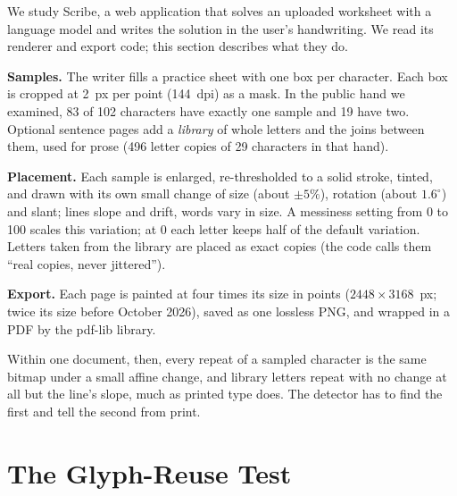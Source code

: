 \documentclass[conference]{IEEEtran}
\begin{document}
We study Scribe, a web application that solves an uploaded worksheet with a language model and writes the solution in
the user's handwriting. We read its renderer and export code; this section describes what they do.

\textbf{Samples.} The writer fills a practice sheet with one box per character. Each box is cropped at 2~px per point
(144~dpi) as a mask. In the public hand we examined, 83 of 102 characters have exactly one sample and 19 have two.
Optional sentence pages add a \emph{library} of whole letters and the joins between them, used for prose (496 letter
copies of 29 characters in that hand).

\textbf{Placement.} Each sample is enlarged, re-thresholded to a solid stroke, tinted, and drawn with its own small
change of size (about $\pm5\%$), rotation (about $1.6^\circ$) and slant; lines slope and drift, words vary in size. A
messiness setting from 0 to 100 scales this variation; at 0 each letter keeps half of the default variation. Letters
taken from the library are placed as exact copies (the code calls them ``real copies, never jittered'').

\textbf{Export.} Each page is painted at four times its size in points ($2448\times3168$~px; twice its size before
October 2026), saved as one lossless PNG, and wrapped in a PDF by the pdf-lib library.

Within one document, then, every repeat of a sampled character is the same bitmap under a small affine change, and
library letters repeat with no change at all but the line's slope, much as printed type does. The detector has to
find the first and tell the second from print.

\section{The Glyph-Reuse Test}
\label{sec:method}
\end{document}
